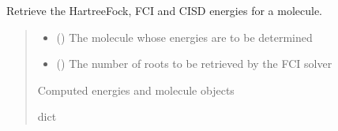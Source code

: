 \documentclass[letterpaper,10pt,english]{sphinxmanual}
\begin{document}

\begin{fulllineitems}
\label{\detokenize{api:MSTOOpt.getEnergies}}
\pysigstartsignatures
\pysiglinewithargsret
{}
{\sphinxparamcomma {}}
{}
\pysigstopsignatures
\sphinxAtStartPar
Retrieve the Hartree\sphinxhyphen{}Fock, FCI and CISD energies for a molecule.
\begin{quote}\begin{description}
\begin{itemize}
\item {} 
\sphinxAtStartPar
{} () \textendash{} The molecule whose energies are to be determined

\item {} 
\sphinxAtStartPar
{} (\sphinxstyleliteralemphasis{\sphinxupquote{, }}\sphinxstyleliteralemphasis{\sphinxupquote{(}}\sphinxstyleliteralemphasis{\sphinxupquote{)}}\sphinxstyleliteralemphasis{\sphinxupquote{, }}) \textendash{} The number of roots to be retrieved by the FCI solver

\end{itemize}

\sphinxAtStartPar
Computed energies and molecule objects

\sphinxAtStartPar
dict

\end{description}\end{quote}


\end{fulllineitems}
\end{document}
